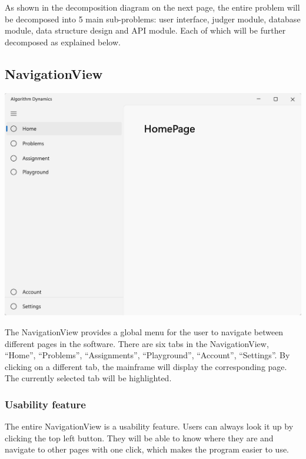 \documentclass[a4paper]{report}
\begin{document}
As shown in the decomposition diagram on the next page, the entire problem will be decomposed into 5 main sub-problems: user interface, judger module, database module, data structure design and API module. Each of which will be further decomposed as explained below.



\subsection{NavigationView}
\label{sec:NavigationViewDesign}

\includegraphics[width=\textwidth, height=\textheight, keepaspectratio]{NavigationView-design}

The NavigationView provides a global menu for the user to navigate between different pages in the software. There are six tabs in the NavigationView, ``Home'', ``Problems'', ``Assignments'', ``Playground'', ``Account'', ``Settings''. By clicking on a different tab, the mainframe will display the corresponding page. The currently selected tab will be highlighted.

\subsubsection{Usability feature}

The entire NavigationView is a usability feature. Users can always look it up by clicking the top left button. They will be able to know where they are and navigate to other pages with one click, which makes the program easier to use.
\end{document}
